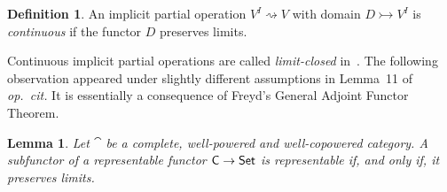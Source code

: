 \documentclass[a4paper,10pt,reqno]{amsart}
\newtheorem{lemma}[theorem]{Lemma}
\theoremstyle{definition}
\newtheorem{definition}[theorem]{Definition}
\theoremstyle{remark}
\begin{document}
\begin{definition}
An implicit partial operation $V^{I} \rightsquigarrow V$ with domain $D\rightarrowtail V^{I}$ is \emph{continuous} if the functor $D$ preserves limits.
\end{definition}


Continuous implicit partial operations are called \emph{limit-closed} in~\cite{Hebert1998}. The following observation appeared under slightly different assumptions in Lemma~11 of \emph{op.~cit.} It is essentially a consequence of Freyd's General Adjoint Functor Theorem.


\begin{lemma}\label{l:subfunctor-of-representable}
Let $\cat$ be a complete, well-powered and well-copowered category. A subfunctor of a representable functor ${\sf C} \to {\sf Set}$ is representable if, and only if, it preserves limits.
\end{lemma}
\end{document}

